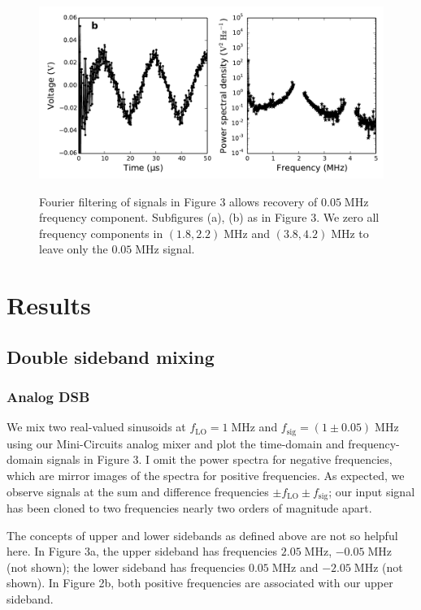 \documentclass[11pt]{article}
\newcommand {\mt}{\mathrm}
\newcommand {\unit}[1]{\; \mt{#1}}
\begin{document}
\begin{figure}[!ht]
    \includegraphics[scale=0.44]{scripts/analog_mixing_DSB_filtered_1.pdf} \\
    \caption{Fourier filtering of signals in Figure 3 allows recovery of $0.05
    \unit{MHz}$ frequency component.  Subfigures (a), (b) as in Figure 3.
    We zero all frequency components in $(1.8, 2.2) \unit{MHz}$ and
    $(3.8, 4.2) \unit{MHz}$ to leave only the $0.05 \unit{MHz}$ signal.}
\end{figure}

\section{Results}

\subsection{Double sideband mixing}

\subsubsection{Analog DSB}

We mix two real-valued sinusoids at $f_{\mt{LO}} = 1 \unit{MHz}$ and
$f_{\mt{sig}} = (1 \pm 0.05) \unit{MHz}$ using our Mini-Circuits analog mixer
and plot the time-domain and frequency-domain signals in Figure 3.  I omit the
power spectra for negative frequencies, which are mirror images of the spectra
for positive frequencies.  As expected, we observe signals at the sum and
difference frequencies $\pm f_{\mt{LO}} \pm f_{\mt{sig}}$; our input signal has
been cloned to two frequencies nearly two orders of magnitude apart.

The concepts of upper and lower sidebands as defined above are not so helpful
here.  In Figure 3a, the upper sideband has frequencies $2.05 \unit{MHz}$,
$-0.05 \unit{MHz}$ (not shown); the lower sideband has frequencies $0.05
\unit{MHz}$ and $-2.05 \unit{MHz}$ (not shown).  In Figure 2b, both positive
frequencies are associated with our upper sideband.
\end{document}
